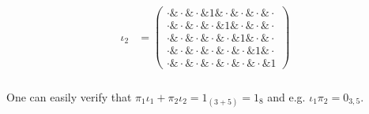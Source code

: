 \begin{example}
\begin{align*}
\begin{array}{rr}
\\
\iota_{2} &= \begin{pmatrix}
\cdot \ampersand \cdot \ampersand \cdot \ampersand 1 \ampersand \cdot \ampersand \cdot \ampersand \cdot \ampersand \cdot \\
\cdot \ampersand \cdot \ampersand \cdot \ampersand \cdot \ampersand 1 \ampersand \cdot \ampersand \cdot \ampersand \cdot \\
\cdot \ampersand \cdot \ampersand \cdot \ampersand \cdot \ampersand \cdot \ampersand 1 \ampersand \cdot \ampersand \cdot \\
\cdot \ampersand \cdot \ampersand \cdot \ampersand \cdot \ampersand \cdot \ampersand \cdot \ampersand 1 \ampersand \cdot \\
\cdot \ampersand \cdot \ampersand \cdot \ampersand \cdot \ampersand \cdot \ampersand \cdot \ampersand \cdot \ampersand 1
\end{pmatrix}
\end{array}
\end{align*}\\
\noindent One can easily verify that $\pi_{1} \iota_{1} + \pi_{2} \iota_{2} = 1_{(3+5)} = 1_{8}$ and e.g. $\iota_{1} \pi_{2} = 0_{3,5}$.\\


\end{example}
